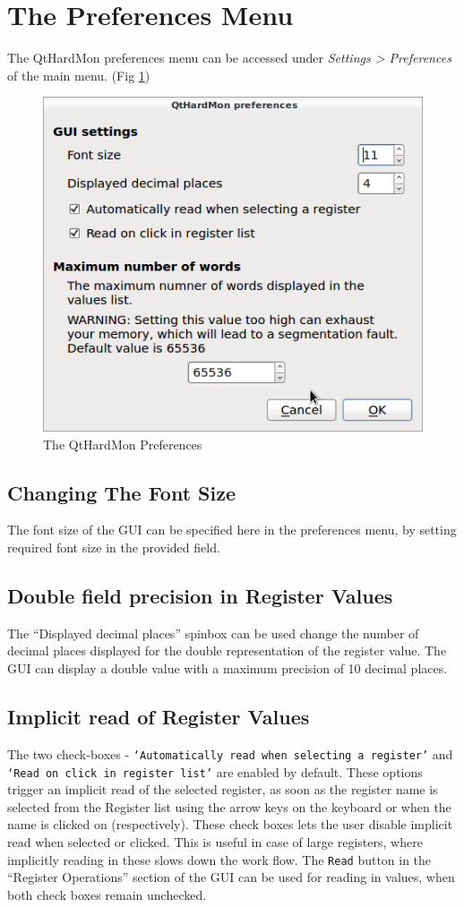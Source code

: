 \section{The Preferences Menu}\label{preference_section} 
The QtHardMon preferences menu can be accessed under 
\textit{Settings > Preferences} of the main menu. (Fig \ref{qthardmon_preferences})

\begin{figure}[htbp] 
	\centering
    \includegraphics[width=.65\textwidth]{images/preferences.png} \caption{The
    QtHardMon Preferences} \label{qthardmon_preferences}			\end{figure}

\subsection{Changing The Font Size} 
The font size of the GUI can be specified here in the preferences menu, 
by setting required font size in the provided field.

\subsection{Double field precision in Register Values}
The ``Displayed decimal places'' spinbox can be used change the number of 
decimal places displayed for the double representation of the register value.
The GUI can display a double value with a maximum precision of 10 decimal places.


\subsection{Implicit read of Register Values}\label{sub::imp_read} 
The two check-boxes - \texttt{`Automatically read when selecting a register'} 
and \texttt{`Read on click in register list'} are enabled by default. 
These options trigger an implicit read of the selected register, as 
soon as the register name is selected from the Register list using the arrow 
keys on the keyboard or when the name is clicked on (respectively). These 
check boxes lets the user disable implicit read when selected or clicked. 
This is useful in case of large registers, where implicitly reading in 
these slows down the work flow. The \texttt{Read} button in the 
``Register Operations'' section of the GUI can be used for reading in values, when 
both check boxes remain unchecked.

